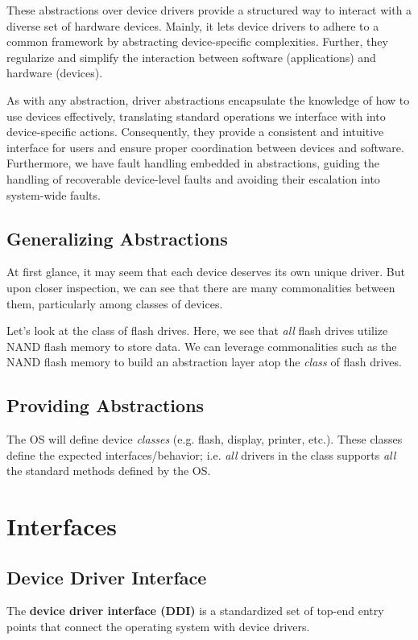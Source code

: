\documentclass{report}
\newcommand{\definitionBegin}[1]{\begin{tcolorbox}[title={Definition: #1}]}
\newcommand{\definitionEnd}{\end{tcolorbox}}
\newcommand{\exampleBegin}[1]{\begin{tcolorbox}[colback=blue!5!white,colframe=black!75!blue,title={Example:
      #1}]}
\newcommand{\exampleEnd}{\end{tcolorbox}}
\begin{document}
These abstractions over device drivers provide a structured way to interact with a diverse set of
hardware devices. Mainly, it lets device drivers to adhere to a common framework by abstracting
device-specific complexities. Further, they regularize and simplify the interaction between software
(applications) and hardware (devices).

As with any abstraction, driver abstractions encapsulate the knowledge of how to use devices
effectively, translating standard operations we interface with into device-specific
actions. Consequently, they provide a consistent and intuitive interface for users and ensure proper
coordination between devices and software. Furthermore, we have fault handling embedded in
abstractions, guiding the handling of recoverable device-level faults and avoiding their escalation into
system-wide faults.


\subsection{Generalizing Abstractions}
At first glance, it may seem that each device deserves its own unique driver. But upon closer
inspection, we can see that there are many commonalities between them, particularly among classes
of devices.

\exampleBegin{Class of Devices}
Let's look at the class of flash drives. Here, we see that \textit{all} flash drives utilize NAND
flash memory to store data. We can leverage commonalities such as the NAND flash memory to build an
abstraction layer atop the \textit{class} of flash drives.
\exampleEnd


\subsection{Providing Abstractions}
The OS will define device \textit{classes} (e.g. flash, display, printer, etc.). These classes
define the expected interfaces/behavior; i.e. \textit{all} drivers in the class supports
\textit{all} the standard methods defined by the OS. 





\section{Interfaces}
\subsection{Device Driver Interface}
\definitionBegin{Device Driver Interface}
The \textbf{device driver interface (DDI)} is a standardized set of top-end entry points that
connect the operating system with device drivers.
\definitionEnd
\end{document}
